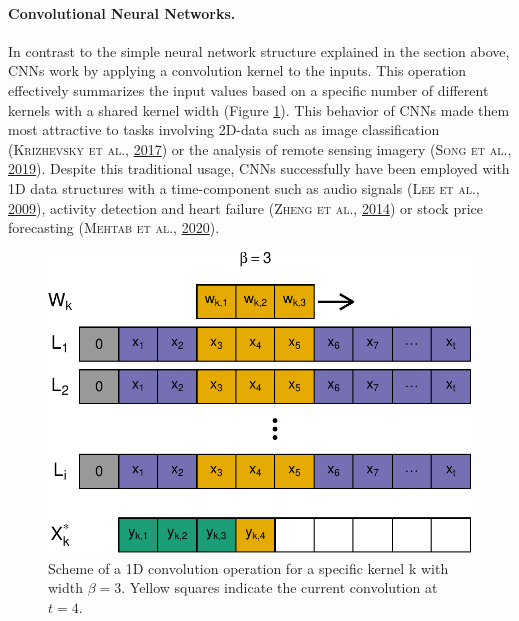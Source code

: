 \documentclass[a4paper,11pt]{article}
\begin{document}
\newpage

\hypertarget{convolutional-neural-networks.}{%
\paragraph{Convolutional Neural Networks.}\label{convolutional-neural-networks.}}

In contrast to the simple neural network structure explained in the section
above, CNNs work by applying a convolution kernel to the inputs. This operation
effectively summarizes the input values based on a specific number of different kernels
with a shared kernel width (Figure \ref{fig:03-methods-cnn}). This behavior of
CNNs made them most attractive to tasks involving 2D-data such as image classification
\textsc{(\textnormal{\textsc{Krizhevsky} \textsc{et al.}}, \textnormal{\protect\hyperlink{ref-krizhevsky2017}{2017}})} or the analysis of remote sensing imagery \textsc{(\textnormal{\textsc{Song} \textsc{et al.}}, \textnormal{\protect\hyperlink{ref-song2019}{2019}})}.
Despite this traditional usage, CNNs successfully have been employed with 1D data
structures with a time-component such as audio signals \textsc{(\textnormal{\textsc{Lee} \textsc{et al.}}, \textnormal{\protect\hyperlink{ref-lee2009}{2009}})}, activity detection
and heart failure \textsc{(\textnormal{\textsc{Zheng} \textsc{et al.}}, \textnormal{\protect\hyperlink{ref-zheng2014}{2014}})} or stock price forecasting \textsc{(\textnormal{\textsc{Mehtab} \textsc{et al.}}, \textnormal{\protect\hyperlink{ref-mehtab2020a}{2020}})}.
\begin{figure}[H]

{\centering \includegraphics{thesis_files/figure-latex/03-methods-cnn-1} 

}

\caption[Scheme of a 1D convolution operation.]{Scheme of a 1D convolution operation for a specific kernel k with width $\beta = 3$. Yellow squares indicate the current convolution at $t=4$.}\label{fig:03-methods-cnn}
\end{figure}
\end{document}
